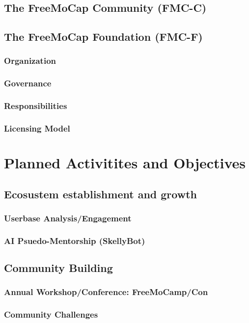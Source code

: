 \documentclass[11pt]{article}
\begin{document}
\subsection{The FreeMoCap Community (FMC-C)}

\subsection{The FreeMoCap Foundation (FMC-F)}
\subsubsection{Organization}
\subsubsection{Governance}
\subsubsection{Responsibilities}
\subsubsection{Licensing Model}

\section{Planned Activitites and Objectives}

\subsection{Ecosustem establishment and growth}
\subsubsection{Userbase Analysis/Engagement}
\subsubsection{AI Psuedo-Mentorship (SkellyBot)}

\subsection{Community Building}
\subsubsection{Annual Workshop/Conference: FreeMoCamp/Con}
\subsubsection{Community Challenges}
\end{document}
